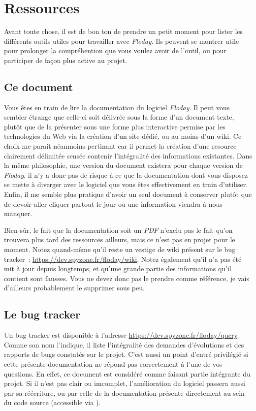 \section{Ressources}
\begin{intro}
Avant toute chose, il est de bon ton de prendre un petit moment pour lister les différents outils utiles pour travailler avec \emph{Floday}.
Ils peuvent se montrer utile pour prolonger la compréhention que vous voulez avoir de l'outil, ou pour participer de façon plus active au projet.
\end{intro}

\subsection{Ce document}
Vous êtes en train de lire la documentation du logiciel \emph{Floday}.
Il peut vous sembler étrange que celle-ci soit délivrée sous la forme d'un document texte, plutôt que de la présenter sous une forme plus interactive permise par les technologies du Web via la création d'un site dédié, ou au moins d'un wiki.
Ce choix me parait néanmoins pertinant car il permet la création d'une resource clairement délimitée sensée contenir l'intégralité des informations existantes.
Dans la même philosophie, une version du document existera pour chaque version de \emph{Floday}, il n'y a donc pas de risque à ce que la documentation dont vous disposez se mette à diverger avec le logiciel que vous êtes effectivement en train d'utiliser.
Enfin, il me semble plus pratique d'avoir un seul document à conserver plutôt que de devoir aller cliquer partout le jour ou une information viendra à nous manquer.

Bien-sûr, le fait que la documentation soit un \emph{PDF} n'exclu pas le fait qu'on trouvera plus tard des ressources ailleurs, mais ce n'est pas en projet pour le moment.
Notez quand-même qu'il reste un vestige de wiki présent sur le bug tracker~: \url{https://dev.spyzone.fr/floday/wiki}.
Notez également qu'il n'a pas été mit à jour depuis longtemps, et qu'une grande partie des informations qu'il contient sont fausses.
Vous ne devez donc pas le prendre comme référence, je vais d'ailleurs probablement le supprimer sous peu.

\subsection{Le bug tracker}
Un bug tracker est disponible à l'adresse \url{https://dev.spyzone.fr/floday/query}.
Comme son nom l'indique, il liste l'intégralité des demandes d'évolutions et des rapports de bugs constatés sur le projet.
C'est aussi un point d'entré privilégié si cette présente documentation ne répond pas correctement à l'une de vos questions.
En effet, ce document est considéré comme faisant partie intégrante du projet.
Si il n'est pas clair ou imcomplet, l'amélioration du logiciel passera aussi par sa réécriture, ou par celle de la documentation présente directement au sein du code source (accessible via ).

